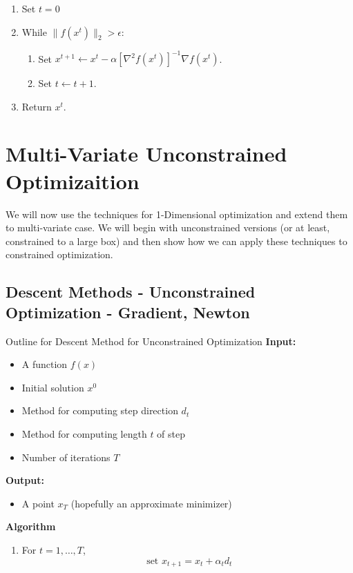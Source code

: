 \begin{enumerate}
\item Set $t= 0$
\item While $\| f(x^t)\|_2 > \epsilon$:
\begin{enumerate}
\item Set $x^{t+1} \leftarrow x^t - \alpha [\nabla^2 f(x^t)]^{-1} \nabla f(x^t)$.
\item Set $t \leftarrow t+1$.
\end{enumerate}
\item Return $x^t$.
\end{enumerate}


\section{Multi-Variate Unconstrained Optimizaition}
We will now use the techniques for 1-Dimensional optimization and extend them to multi-variate case.  We will begin with unconstrained versions (or at least, constrained to a large box) and then show how we can apply these techniques to constrained optimization.

\subsection{Descent Methods - Unconstrained Optimization - Gradient, Newton} 

\begin{general}{Outline for Descent Method for Unconstrained Optimization}{}
\textbf{Input:} 
\begin{itemize}
\item A function $f(x)$
\item Initial solution $x^0$
\item Method for computing step direction $d_t$
\item Method for computing length $t$ of step
\item Number of iterations $T$
\end{itemize}

\textbf{Output:}
\begin{itemize}
\item A point $x_{T}$ (hopefully an approximate minimizer)
\end{itemize}

\textbf{Algorithm}
\begin{enumerate}
\item For $t=1, \dots, T$,
$$
\text{ set } x_{t+1} = x_t + \alpha_t d_t 
$$
\end{enumerate}

\end{general}
